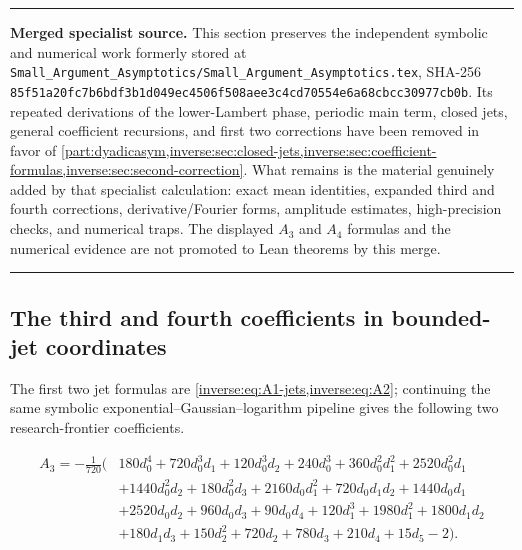 \documentclass[11pt,oneside]{article}
\theoremstyle{definition}
\theoremstyle{remark}
\newenvironment{boxedremark}{%
  \par\smallskip\noindent\begin{center}\begin{minipage}{0.94\textwidth}%
  \color{black}\hrule\vspace{0.6em}\small
}{%
  \vspace{0.6em}\hrule\end{minipage}\end{center}\smallskip
}
\begin{document}
\begin{boxedremark}
\textbf{Merged specialist source.}
This section preserves the independent symbolic and numerical work formerly stored at
\nolinkurl{Small_Argument_Asymptotics/Small_Argument_Asymptotics.tex}, SHA-256
\nolinkurl{85f51a20fc7b6bdf3b1d049ec4506f508aee3c4cd70554e6a68cbcc30977cb0b}.
Its repeated derivations of the lower-Lambert phase, periodic main term, closed jets,
general coefficient recursions, and first two corrections have been removed in favor of
\cref{part:dyadicasym,inverse:sec:closed-jets,inverse:sec:coefficient-formulas,inverse:sec:second-correction}.
What remains is the material genuinely added by that specialist calculation: exact mean
identities, expanded third and fourth corrections, derivative/Fourier forms, amplitude
estimates, high-precision checks, and numerical traps.  The displayed \(A_3\) and \(A_4\) formulas and
the numerical evidence are not promoted to Lean theorems by this merge.
\end{boxedremark}

\subsection{The third and fourth coefficients in bounded-jet coordinates}
The first two jet formulas are \cref{inverse:eq:A1-jets,inverse:eq:A2}; continuing the same
symbolic exponential--Gaussian--logarithm pipeline gives the following two research-frontier
coefficients.

\begin{equation}\label{smallarg:eq:A3jets}
\begin{aligned}
  A_3=-\frac{1}{720}\bigl(&180d_0^4+720d_0^3d_1+120d_0^3d_2+240d_0^3
    +360d_0^2d_1^2+2520d_0^2d_1\\
   &+1440d_0^2d_2+180d_0^2d_3+2160d_0d_1^2+720d_0d_1d_2+1440d_0d_1\\
   &+2520d_0d_2+960d_0d_3+90d_0d_4+120d_1^3+1980d_1^2+1800d_1d_2\\
   &+180d_1d_3+150d_2^2+720d_2+780d_3+210d_4+15d_5-2\bigr).
\end{aligned}
\end{equation}
\end{document}
